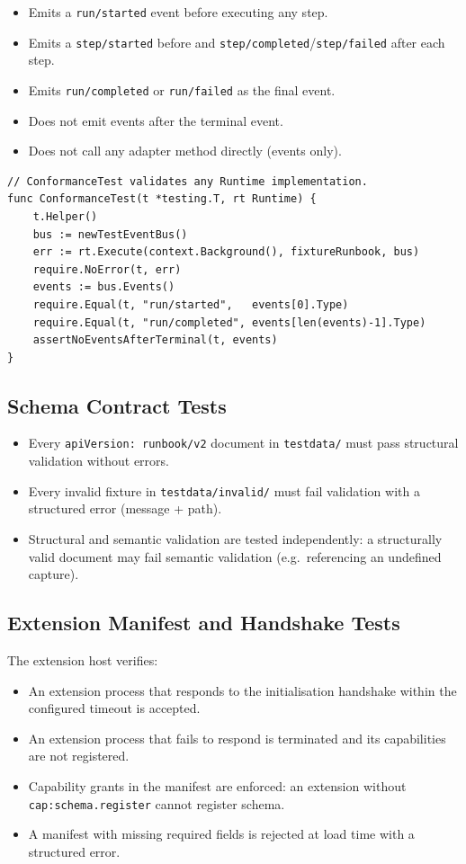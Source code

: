 \begin{itemize}
  \item Emits a \texttt{run/started} event before executing any step.
  \item Emits a \texttt{step/started} before and \texttt{step/completed}/\texttt{step/failed} after each step.
  \item Emits \texttt{run/completed} or \texttt{run/failed} as the final event.
  \item Does not emit events after the terminal event.
  \item Does not call any adapter method directly (events only).
\end{itemize}

\begin{verbatim}
// ConformanceTest validates any Runtime implementation.
func ConformanceTest(t *testing.T, rt Runtime) {
    t.Helper()
    bus := newTestEventBus()
    err := rt.Execute(context.Background(), fixtureRunbook, bus)
    require.NoError(t, err)
    events := bus.Events()
    require.Equal(t, "run/started",   events[0].Type)
    require.Equal(t, "run/completed", events[len(events)-1].Type)
    assertNoEventsAfterTerminal(t, events)
}
\end{verbatim}

\subsection{Schema Contract Tests}

\begin{itemize}
  \item Every \texttt{apiVersion: runbook/v2} document in \texttt{testdata/} must pass structural validation without errors.
  \item Every invalid fixture in \texttt{testdata/invalid/} must fail validation with a structured error (message + path).
  \item Structural and semantic validation are tested independently: a structurally valid document may fail semantic validation (e.g.\ referencing an undefined capture).
\end{itemize}

\subsection{Extension Manifest and Handshake Tests}

The extension host verifies:

\begin{itemize}
  \item An extension process that responds to the initialisation handshake within the configured timeout is accepted.
  \item An extension process that fails to respond is terminated and its capabilities are not registered.
  \item Capability grants in the manifest are enforced: an extension without \texttt{cap:schema.register} cannot register schema.
  \item A manifest with missing required fields is rejected at load time with a structured error.
\end{itemize}

